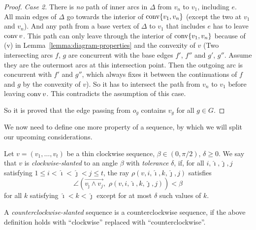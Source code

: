 \begin{proof}
  \textit{Case 2.} There is \emph{no} path of inner arcs in $\Delta$ from $v_n$ to $v_1$, including $e$.\\
  All main edges of $\Delta$ go towards the interior of $\operatorname{conv} \{v_1, v_n\}$ (except the two at $v_1$ and $v_n$). And any path from a base vertex of $\Delta$ to $v_1$ that includes $e$ has to leave $\operatorname{conv} v$. This path can only leave through the interior of $\operatorname{conv}\{v_1,v_n\}$ because of (v) in Lemma~\ref{lemma:diagram-properties} and the convexity of $v$
  (Two intersecting arcs $f$, $g$ are concurrent with the base edges $f'$, $f''$ and $g'$, $g''$. Assume they are the outermost arcs at this intersection point. Then the outgoing arc is concurrent with $f'$ and $g''$, which always fixes it between the continuations of $f$ and $g$ by the convexity of $v$).
  So it has to intersect the path from $v_n$ to $v_1$ before leaving $\operatorname{conv} v$. This contradicts the assumption of this case.

  So it is proved that the edge passing from $o_g$ contains $v_g$ for all $g \in G$.
\end{proof}

We now need to define one more property of a sequence, by which we will split our upcoming considerations.

\begin{definition}
  Let $v=(v_1,\ldots,v_t)$ be a thin clockwise sequence, ${\beta\in(0,\pi/2)}$, $\delta\geq 0$. We say that $v$ is \emph{clockwise-slanted} to an angle $\beta$ with \emph{tolerance} $\delta$, if, for all $i,\hat{\imath},\hat{\jmath}, j$ satisfying $1\leq i<\hat{\imath}<\hat{\jmath}<j\leq t$, the ray ${\rho}(v,i,\hat{\imath},k,\hat{\jmath}, j)$ satisfies $$\angle\left(\overrightarrow{v_{\hat{\jmath}}\wedge v_j},\,\,\rho(v,i,\hat{\imath},k,\hat{\jmath}, j)\right)<\beta$$ for all $k$ satisfying $\hat{\imath}<k<\hat{\jmath}$ except for at most $\delta$ such values of $k$. 

  A \emph{counterclockwise-slanted} sequence is a counterclockwise sequence, if the above definition holds with ``clockwise'' replaced with ``counterclockwise''.
\end{definition}


